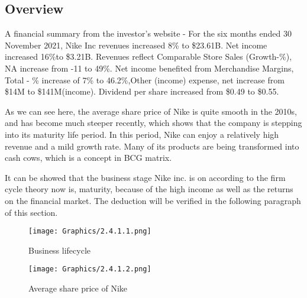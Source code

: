 \documentclass[a4paper, 12pt]{report}
\begin{document}
\subsection{Overview}
A financial summary from the investor’s website - For the six months ended 30 November 2021, Nike Inc revenues increased 8\% to \$23.61B. Net income increased 16\%to \$3.21B. Revenues reflect Comparable Store Sales (Growth-\%), NA increase from -11 to 49\%. Net income benefited from Merchandise Margins, Total - \% increase of 7\% to 46.2\%,Other (income) expense, net increase from \$14M to \$141M(income). Dividend per share increased from \$0.49 to \$0.55.\par
As we can see here, the average share price of Nike is quite smooth in the 2010s, and has become much steeper recently, which shows that the company is stepping into its maturity life period. In this period, Nike can enjoy a relatively high revenue and a mild growth rate. Many of its products are being transformed into cash cows, which is a concept in BCG matrix. \par
It can be showed that the business stage Nike inc. is on according to the firm cycle theory now is, maturity, because of the high income as well as the returns on the financial market. The deduction will be verified in the following paragraph of this section.\par

 \begin{figure}[htbp]
     \centering
     \begin{minipage}{.45\linewidth}
     \centering
     \texttt{[image: Graphics/2.4.1.1.png]}
     \caption{\label{2.4.1.1}Business lifecycle}
     \end{minipage}
     \qquad
     \begin{minipage}{.45\linewidth}
     \centering
     \texttt{[image: Graphics/2.4.1.2.png]}
     \caption{\label{2.4.1.2}Average share price of Nike}
     \end{minipage}
 \end{figure}
\end{document}
